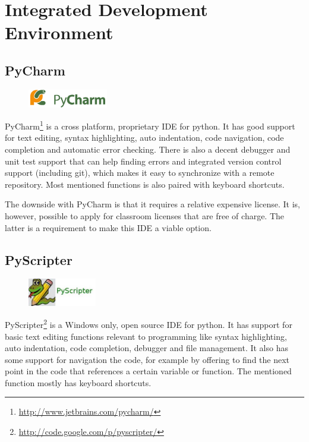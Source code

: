\section{Integrated Development Environment}
\label{sec:pre:ide}

\subsection{PyCharm}
\begin{figure}
	\vspace{-20pt}
	\includegraphics[width=3.5cm]{./planning/img/pycharm_logo}
	\vspace{-20pt}
\end{figure}
PyCharm\footnote{\url{http://www.jetbrains.com/pycharm/}}
is a cross platform, proprietary IDE for python. It has good support
for text editing, syntax highlighting, auto indentation, code navigation, code
completion and automatic error checking. There is also a decent debugger and
unit test support that can help finding errors and integrated version control
support (including git), which makes it easy to synchronize with a remote
repository. Most mentioned functions is also paired with keyboard shortcuts.

The downside with PyCharm is that it requires a relative expensive license. It
is, however, possible to apply for classroom licenses that are free of charge.
The latter is a requirement to make this IDE a viable option.

\subsection{PyScripter}
\begin{figure}
	\vspace{-20pt}
	\includegraphics[width=3cm]{./planning/img/pyscripter_logo}
	\vspace{-20pt}
\end{figure}
PyScripter\footnote{\url{http://code.google.com/p/pyscripter/}}
is a Windows only, open source IDE for python. It has support for
basic text editing functions relevant to programming like syntax highlighting,
auto indentation, code completion, debugger and file management. It also has
some support for navigation the code, for example by offering to find the next
point in the code that references a certain variable or function. The mentioned
function mostly has keyboard shortcuts.

